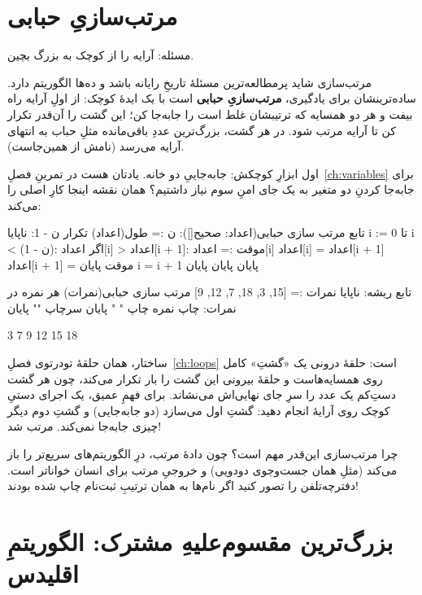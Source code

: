 \section{مرتب‌سازیِ حبابی}

مسئله: آرایه را از کوچک به بزرگ بچین.

مرتب‌سازی شاید پرمطالعه‌ترین مسئلهٔ تاریخِ رایانه باشد و ده‌ها الگوریتم
دارد. ساده‌ترینشان برای یادگیری، \textbf{مرتب‌سازیِ حبابی} است با یک
ایدهٔ کوچک: از اولِ آرایه راه بیفت و هر دو همسایه که ترتیبشان غلط است را
جابه‌جا کن؛ این گشت را آن‌قدر تکرار کن تا آرایه مرتب شود. در هر گشت،
بزرگ‌ترین عددِ باقی‌مانده مثلِ حباب به انتهای آرایه می‌رسد (نامش از
همین‌جاست).

اول ابزارِ کوچکش: جابه‌جاییِ دو خانه. یادتان هست در تمرینِ فصلِ~\ref{ch:variables} برای جابه‌جا کردنِ دو متغیر به یک جای امنِ سوم نیاز
داشتیم؟ همان نقشه اینجا کارِ اصلی را می‌کند:

\begin{salamfa}
تابع مرتب سازی حبابی(اعداد: صحیح[]):
    ن := طول(اعداد)
    تکرار ن - 1:
        ناپایا i := 0
        تا i < (ن - 1):
            اگر اعداد[i] > اعداد[i + 1]:
                موقت := اعداد[i]
                اعداد[i] = اعداد[i + 1]
                اعداد[i + 1] = موقت
            پایان
            i = i + 1
        پایان
    پایان
پایان

تابع ریشه:
    ناپایا نمرات := [15, 3, 18, 7, 12, 9]
    مرتب سازی حبابی(نمرات)
    هر نمره در نمرات:
        چاپ نمره
        چاپ " "
    پایان
    سرچاپ ""
پایان
\end{salamfa}

\begin{progout}
3 7 9 12 15 18
\end{progout}

ساختار، همان حلقهٔ تودرتوی فصلِ~\ref{ch:loops} است: حلقهٔ درونی یک «گشتِ»
کامل روی همسایه‌هاست و حلقهٔ بیرونی این گشت را  بار تکرار
می‌کند، چون هر گشت دستِ‌کم یک عدد را سرِ جای نهایی‌اش می‌نشاند. برای
فهمِ عمیق، یک اجرای دستیِ کوچک روی آرایهٔ \code{[3, 1, 2]} انجام دهید:
گشتِ اول \code{[1, 2, 3]} می‌سازد (دو جابه‌جایی) و گشتِ دوم دیگر چیزی
جابه‌جا نمی‌کند. مرتب شد!

\begin{note}
چرا مرتب‌سازی این‌قدر مهم است؟ چون دادهٔ مرتب، درِ الگوریتم‌های سریع‌تر
را باز می‌کند (مثلِ همان جست‌وجوی دودویی) و خروجیِ مرتب برای انسان
خواناتر است. دفترچه‌تلفن را تصور کنید اگر نام‌ها به همان ترتیبِ ثبت‌نام
چاپ شده بودند!
\end{note}

\section{بزرگ‌ترین مقسوم‌علیهِ مشترک: الگوریتمِ اقلیدس}

